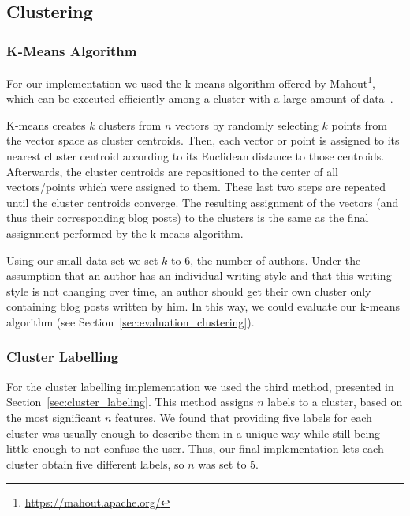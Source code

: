 \subsection{Clustering}
\label{sec:impl_clustering}


\subsubsection{K-Means Algorithm}
\label{sec:impl_k-means}
For our implementation we used the k-means algorithm offered by Mahout\footnote{\url{https://mahout.apache.org/}}, which can be executed efficiently among a cluster with a large amount of data~\cite{esteves2011k}.


K-means creates $k$ clusters from $n$ vectors by randomly selecting $k$ points from the vector space as cluster centroids.
Then, each vector or point is assigned to its nearest cluster centroid according to its Euclidean distance to those centroids.
Afterwards, the cluster centroids are repositioned to the center of all vectors/points which were assigned to them.
These last two steps are repeated until the cluster centroids converge.
The resulting assignment of the vectors (and thus their corresponding blog posts) to the clusters is the same as the final assignment performed by the k-means algorithm.


Using our small data set we set $k$ to $6$, the number of authors.
Under the assumption that an author has an individual writing style and that this writing style is not changing over time, an author should get their own cluster only containing blog posts written by him.
In this way, we could evaluate our k-means algorithm (see Section~\ref{sec:evaluation_clustering}).


\subsubsection{Cluster Labelling}
\label{sec:impl_cluster_labeling}
For the cluster labelling implementation we used the third method, presented in Section~\ref{sec:cluster_labeling}.
This method assigns $n$ labels to a cluster, based on the most significant $n$ features.
We found that providing five labels for each cluster was usually enough to describe them in a unique way while still being little enough to not confuse the user.
Thus, our final implementation lets each cluster obtain five different labels, so $n$ was set to $5$.